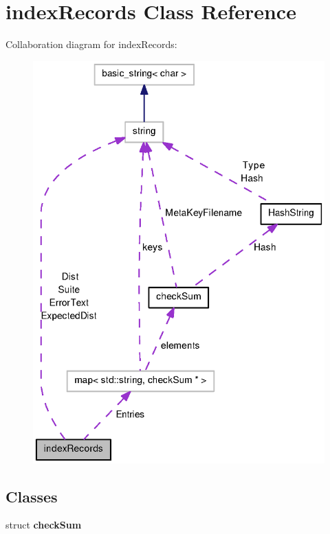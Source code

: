 \section{index\-Records \-Class \-Reference}
\label{classindexRecords}


\-Collaboration diagram for index\-Records\-:
\nopagebreak
\begin{figure}[H]
\begin{center}
\leavevmode
\includegraphics[width=350pt]{classindexRecords__coll__graph}
\end{center}
\end{figure}
\subsection*{\-Classes}
\begin{DoxyCompactItemize}
\item 
struct {\bf check\-Sum}
\end{DoxyCompactItemize}
